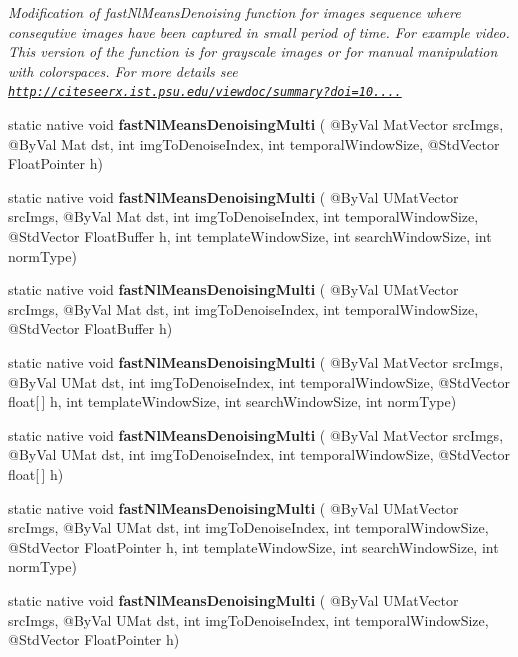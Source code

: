 \begin{DoxyCompactItemize}
\begin{DoxyCompactList}\small\item\em Modification of fast\+Nl\+Means\+Denoising function for images sequence where consequtive images have been captured in small period of time. For example video. This version of the function is for grayscale images or for manual manipulation with colorspaces. For more details see \href{http://citeseerx.ist.psu.edu/viewdoc/summary?doi=10.1.1.131.6394}{\tt http\+://citeseerx.\+ist.\+psu.\+edu/viewdoc/summary?doi=10....} \end{DoxyCompactList}\item 
static native void {\bfseries fast\+Nl\+Means\+Denoising\+Multi} ( @By\+Val Mat\+Vector src\+Imgs, @By\+Val Mat dst, int img\+To\+Denoise\+Index, int temporal\+Window\+Size, @Std\+Vector Float\+Pointer h)
\item 
static native void {\bfseries fast\+Nl\+Means\+Denoising\+Multi} ( @By\+Val U\+Mat\+Vector src\+Imgs, @By\+Val Mat dst, int img\+To\+Denoise\+Index, int temporal\+Window\+Size, @Std\+Vector Float\+Buffer h, int template\+Window\+Size, int search\+Window\+Size, int norm\+Type)
\item 
static native void {\bfseries fast\+Nl\+Means\+Denoising\+Multi} ( @By\+Val U\+Mat\+Vector src\+Imgs, @By\+Val Mat dst, int img\+To\+Denoise\+Index, int temporal\+Window\+Size, @Std\+Vector Float\+Buffer h)
\item 
static native void {\bfseries fast\+Nl\+Means\+Denoising\+Multi} ( @By\+Val Mat\+Vector src\+Imgs, @By\+Val U\+Mat dst, int img\+To\+Denoise\+Index, int temporal\+Window\+Size, @Std\+Vector float\mbox{[}$\,$\mbox{]} h, int template\+Window\+Size, int search\+Window\+Size, int norm\+Type)
\item 
static native void {\bfseries fast\+Nl\+Means\+Denoising\+Multi} ( @By\+Val Mat\+Vector src\+Imgs, @By\+Val U\+Mat dst, int img\+To\+Denoise\+Index, int temporal\+Window\+Size, @Std\+Vector float\mbox{[}$\,$\mbox{]} h)
\item 
static native void {\bfseries fast\+Nl\+Means\+Denoising\+Multi} ( @By\+Val U\+Mat\+Vector src\+Imgs, @By\+Val U\+Mat dst, int img\+To\+Denoise\+Index, int temporal\+Window\+Size, @Std\+Vector Float\+Pointer h, int template\+Window\+Size, int search\+Window\+Size, int norm\+Type)
\item 
static native void {\bfseries fast\+Nl\+Means\+Denoising\+Multi} ( @By\+Val U\+Mat\+Vector src\+Imgs, @By\+Val U\+Mat dst, int img\+To\+Denoise\+Index, int temporal\+Window\+Size, @Std\+Vector Float\+Pointer h)

\end{DoxyCompactItemize}
